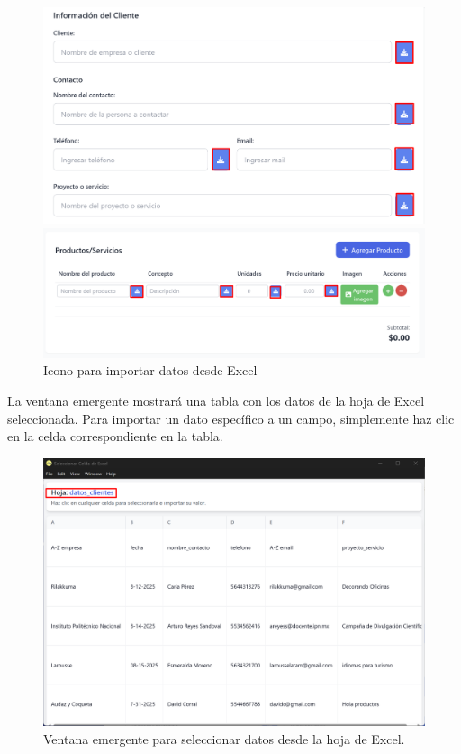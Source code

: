 \documentclass{Pretexto/bluereport}
\begin{document}
\begin{minipage}
\begin{figure}[H]
    \centering
    \begin{minipage}{0.456\linewidth}
        \centering
        \includegraphics[width=\linewidth]{img/llenar_datos_excel.png}
    \end{minipage}
    \begin{minipage}{0.49\linewidth}
        \centering
        \includegraphics[width=\linewidth]{img/registrar_productos_excel.png}
    \end{minipage}

    \caption{Icono para importar datos desde Excel}
    \label{fig:icono-importar}
\end{figure}

La ventana emergente mostrará una tabla con los datos de la hoja de Excel seleccionada.
Para importar un dato específico a un campo, simplemente haz clic en la celda correspondiente en la tabla.
\begin{figure}[H] 
    \centering
        \includegraphics[width=0.6\linewidth]{img/hoja_excel.png}
    \caption{Ventana emergente para seleccionar datos desde la hoja de Excel.}
    \label{fig:seleccionar_hoja}
\end{figure}


\end{minipage}
\end{document}
